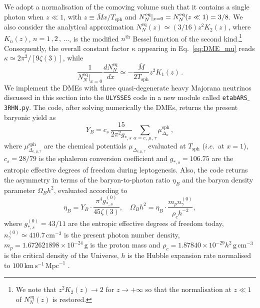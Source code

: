 \documentclass[12pt, a4paper]{article}
\def\Mav{\bar{M}}
\def\sph{\text{sph}}
\begin{document}
We adopt a normalisation of the comoving volume such that it contains a single photon when $z\ll 1$, with $z\equiv \Mav x/T_{\sph}$
and $N_N^{\rm eq}|_{x=0} = N^\text{eq}_{N}(z\ll 1) = 3/8$. We also consider the analytical approximation $ N^\text{eq}_{N}(z) \simeq (3/16) z^2 K_2(z)$, where $K_n(z)$, $n = 1\,,2\,,\,...$, is the modified $n^\text{th}$ Bessel function of the second kind.\footnote{We note that $z^2K_2(z)\to 2$ for $z\to +\infty$ so that the normalisation at $z\ll1$ of $N_{N}^\text{eq}(z)$ is restored.} Consequently, the overall constant factor $\kappa$ appearing in Eq.~\eqref{eq:DME_mu} reads $\kappa \simeq 2\pi^2/[9\zeta(3)]$,
 while
 \begin{equation}
  \frac{1}{N_{N}^\text{eq}|_{x=0}}\frac{dN_{N}^\text{eq}}{dx} \simeq -\frac{\Mav}{2T_{\sph}}z^2K_1(z)\,.
 \end{equation}
We implement the DMEs with three quasi-degenerate heavy Majorana neutrinos discussed in this section into the \texttt{ULYSSES} code in a new module called \texttt{etabARS$\_$3RHN.py}.
The code, after solving numerically the DMEs, returns the present baryonic yield as
 \begin{equation}
  Y_B = c_s\,\frac{15}{2\pi^2 g_{*,s}}
 \sum_{\alpha = e,\,\mu,\,\tau} \mu_{\Delta_\alpha}^{\sph}\,,
 \label{eq:YBl}
 \end{equation}
%
where $\mu_{\Delta_{e,\mu,\tau}}^{\sph}$ are the chemical potentials $\mu_{\Delta_{e,\mu,\tau}}$ evaluated at $T_{\sph}$ ($i.e.$~at $x=1$), $c_s = 28/79$ is the sphaleron conversion coefficient and $g_{*,s} = 106.75$ are the entropic effective degrees of freedom during leptogenesis. Also, the code returns the asymmetry in terms of the baryon-to-photon ratio $\eta_{B}$ and the baryon density parameter $\Omega_Bh^2$, evaluated according to
\begin{equation}
 \eta_B = Y_{B} \cdot \frac{\pi^4 g_{*,s}^{(0)}}{45\zeta(3)},\quad \Omega_Bh^2 = \eta_B\cdot \frac{m_p n_\gamma^{(0)}}{\rho_c h^{-2}},
\end{equation}
where $g_{*,s}^{(0)} = 43/11$ are the entropic effective degrees of freedom today, $n_\gamma^{(0)}\simeq 410.7\,\text{cm}^{-3}$ is the present photon number density, $m_p = 1.672621898\times 10^{-24}\,\text{g}$ is the proton mass and $\rho_c = 1.87840 \times 10^{-29}h^2\,\text{g}\,\text{cm}^{-3}$ is the critical density of the Universe, $h$ is the Hubble expansion rate normalised to $100\,\text{km}\,\text{s}^{-1}\,\text{Mpc}^{-1}$ \cite{ParticleDataGroup:2024cfk}. 
\end{document}
